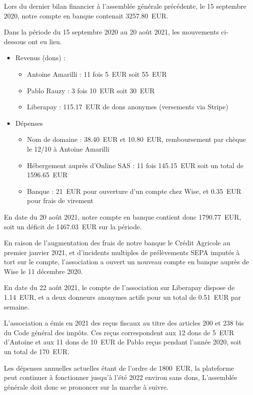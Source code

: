 \documentclass[a4paper]{article}
\begin{document}
Lors du dernier bilan financier à l'assemblée générale précédente, le 15
septembre 2020, notre compte en banque contenait 3257.80~EUR.

Dans la période du 15 septembre 2020 au 20 août 2021, les mouvements ci-dessous ont eu lieu.

\begin{itemize}
\item Revenus (dons) :
  \begin{itemize}
    \item Antoine Amarilli : 11 fois 5~EUR soit 55~EUR
    \item Pablo Rauzy : 3 fois 10~EUR soit 30~EUR
    \item Liberapay : 115.17~EUR de dons anonymes (versements via Stripe)
  \end{itemize}
\item Dépenses
  \begin{itemize}
    \item Nom de domaine : 38.40~EUR et 10.80~EUR, remboursement par chèque le
      12/10 à Antoine Amarilli
    \item Hébergement auprès d'Online SAS : 11 fois 145.15~EUR soit un total de 1596.65~EUR
    \item Banque : 21~EUR pour ouverture d'un compte chez Wise, et 0.35~EUR pour
      frais de virement
  \end{itemize}
\end{itemize}

En date du 20 août 2021, notre compte en banque contient donc 1790.77~EUR, soit
un déficit de 1467.03~EUR sur la période.

En raison de l'augmentation des frais de notre banque le Crédit Agricole au
premier janvier 2021, et d'incidents multiples de prélèvements SEPA imputés à
tort sur le compte, l'association a ouvert un nouveau compte en banque auprès de
Wise le 11 décembre 2020.

En date du 22 août 2021, le compte de l'association sur Liberapay dispose de
1.14~EUR, et a deux donneurs anonymes actifs pour un total de 0.51~EUR par
semaine.

L'association a émis en 2021 des reçus fiscaux au titre des articles 200 et 238
bis du Code général des impôts. Ces reçus correspondent aux 12 dons de 5~EUR
d'Antoine et aux 11 dons de 10~EUR de Pablo reçus pendant l'année 2020, soit un total de 170~EUR.

Les dépenses annuelles actuelles étant de l'ordre de 1800~EUR, la plateforme
peut continuer à fonctionner jusqu'à l'été 2022 environ sans dons, L'assemblée
générale doit donc se prononcer sur la marche à suivre.
\end{document}
